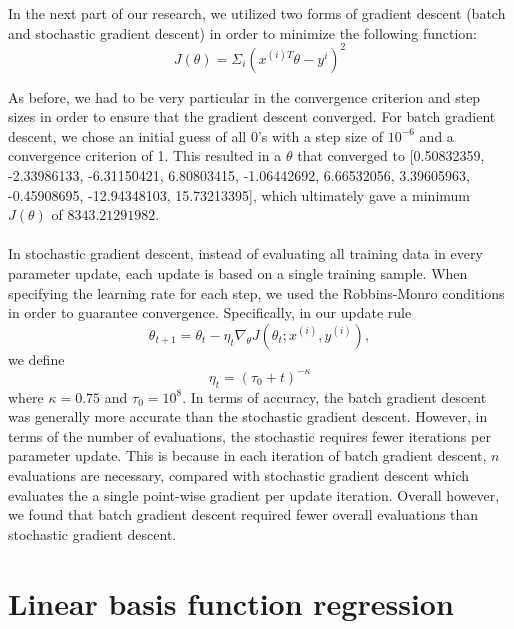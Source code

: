 \documentclass{article}
\begin{document}
In the next part of our research, we utilized two forms of gradient descent (batch and stochastic gradient descent) in order to minimize the following function: \\
$$J(\theta) = \Sigma_{i}(x^{(i)T}\theta - y^{i})^2$$

As before, we had to be very particular in the convergence criterion and step sizes in order to ensure that the gradient descent converged. For batch gradient descent, we chose an initial guess of all $0$'s with a step size of $10^{-6}$ and a convergence criterion of 1. This resulted in a $\theta$ that converged to [0.50832359, -2.33986133, -6.31150421, 6.80803415, -1.06442692, 6.66532056, 3.39605963, -0.45908695, -12.94348103, 15.73213395], which ultimately gave a minimum $J(\theta)$ of $8343.21291982$. \\ \\

In stochastic gradient descent, instead of evaluating all training data in every parameter update, each update is based on a single training sample. When specifying the learning rate for each step, we used the Robbins-Monro conditions in order to guarantee convergence. Specifically, in our update rule
$$\theta_{t+1} = \theta_{t} - \eta_{t}\nabla_{\theta}J(\theta_t; x^{(i)}, y^{(i)}),$$
we define
$$\eta_t = (\tau_0 + t)^{-\kappa}$$
where $\kappa = 0.75$ and $\tau_{0} = 10^{8}$. In terms of accuracy, the batch gradient descent was generally more accurate than the stochastic gradient descent. However, in terms of the number of evaluations, the stochastic requires fewer iterations per parameter update. This is because in each iteration of batch gradient descent, $n$ evaluations are necessary, compared with stochastic gradient descent which evaluates the a single point-wise gradient per update iteration. Overall however, we found that batch gradient descent required fewer overall evaluations than stochastic gradient descent.

\section{Linear basis function regression}
\end{document}
